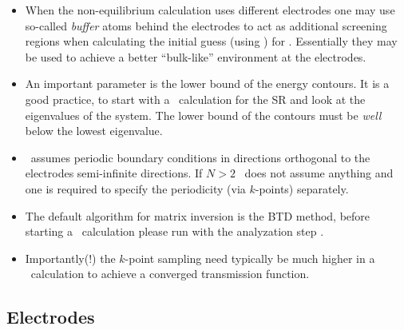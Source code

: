 \begin{itemize}
  \item %
  When the non-equilibrium calculation uses different electrodes one
  may use so-called \emph{buffer} atoms behind the electrodes to act
  as additional screening regions when calculating the initial guess
  (using \siesta) for \tsiesta. Essentially they may be used to
  achieve a better ``bulk-like'' environment at the electrodes.

  
  \item%
  An important parameter is the lower bound of the energy contours. It
  is a good practice, to start with a \siesta\ calculation for the SR
  and look at the eigenvalues of the system. The lower bound of the
  contours must be \emph{well} below the lowest eigenvalue.

  \item%
  \tsiesta\ assumes periodic boundary conditions in directions
  orthogonal to the electrodes semi-infinite directions. If $N>2$
  \tsiesta\ does not assume anything and one is required to specify
  the periodicity (via $k$-points) separately.

  \item%
  The default algorithm for matrix inversion is the BTD method, before
  starting a \tsiesta\ calculation please run with the analyzation
  step .

  \item%
  Importantly(!) the $k$-point sampling need typically be much higher
  in a \tbtrans\ calculation to achieve a converged transmission
  function.

\end{itemize}

\subsection{Electrodes}

